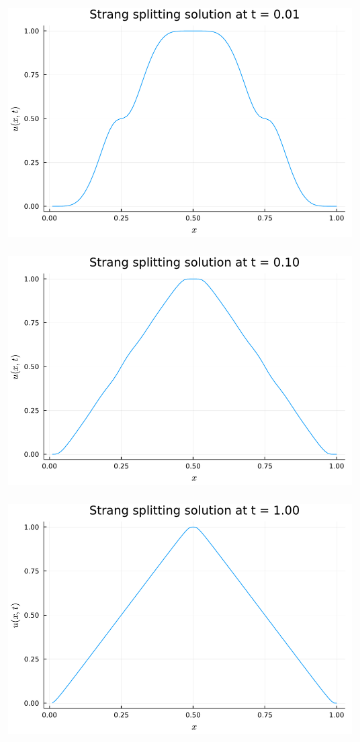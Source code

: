 \documentclass{article}
\begin{document}
\begin{figure}[H]
	\centering
	\begin{subfigure}{0.495\linewidth}
		\centering
		\includegraphics[width=\linewidth]{p4at0.01.pdf}
	\end{subfigure}
	\begin{subfigure}{0.495\linewidth}
		\centering
		\includegraphics[width=\linewidth]{p4at0.10.pdf}
	\end{subfigure}
	\begin{subfigure}{0.495\linewidth}
		\centering
		\includegraphics[width=\linewidth]{p4at1.00.pdf}
	\end{subfigure}
\end{figure}
\end{document}
